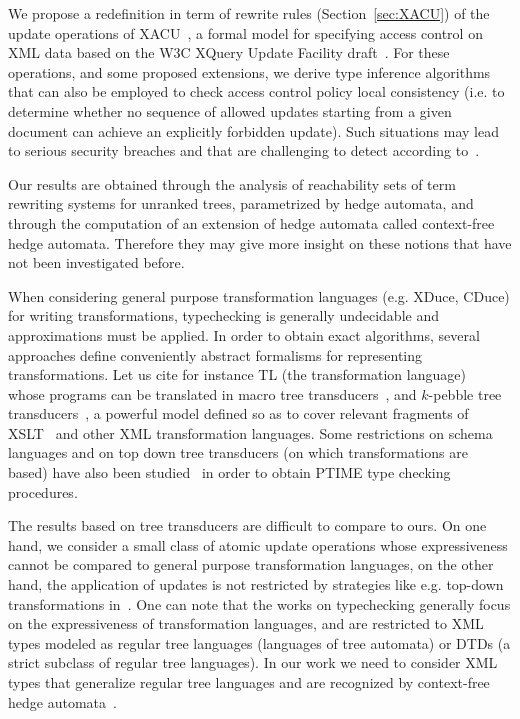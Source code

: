 \documentclass[a4paper]{article}
\newcommand{\remarque}[1]{}
\theoremstyle{plain}
\newcommand{\XACU}{\textsf{XACU}}
\begin{document}
We propose a redefinition in term of rewrite rules (Section~\ref{sec:XACU})  
of the update operations of \XACU~\cite{FundulakiManeth07}, 
a formal model for specifying access control on XML data 
based on the W3C XQuery Update Facility draft~\cite{xqupdate}.
For these operations, and some proposed extensions,
we derive type inference algorithms that can also be 
employed to check access control policy local consistency
(i.e. to determine whether no sequence of allowed updates 
 starting from a given document can achieve 
 an explicitly forbidden update). 
Such situations may lead to serious security breaches 
and that are  challenging to detect according to~\cite{FundulakiManeth07}.
\remarque{+ provide control of application context}
Our results are obtained through the analysis of reachability sets of 
term rewriting systems for unranked trees, 
parametrized by hedge automata, and through the computation  
of an extension of hedge automata called context-free hedge automata. 
Therefore they may give more insight on these notions that have not been investigated before. 


\medskip{}
When considering general purpose transformation languages (e.g. XDuce, CDuce)
for writing transformations, typechecking is generally undecidable
and approximations must be applied.
In order to obtain exact algorithms, several approaches define conveniently
abstract formalisms for representing transformations.
Let us cite for instance TL (the transformation language)~\cite{ManethBPS05}
whose programs can be translated in macro tree transducers~\cite{MTT04},
and $k$-pebble tree transducers~\cite{MiloSuciuVianu03},
a powerful model defined so as to cover relevant fragments
of XSLT~\cite{XSLT} and other XML transformation languages.
Some restrictions on schema languages and on
top down tree transducers (on which transformations are based)
have also been studied~\cite{MartensNeven04}
in order to obtain PTIME type checking procedures.

The  results based on tree transducers are difficult to compare to ours. 
On one hand, we consider a small class of atomic update operations
whose expressiveness cannot be compared to general purpose transformation languages,
on the other hand, the application of updates is not restricted by strategies 
like e.g. top-down  transformations in~\cite{MartensNeven04}.
One can note that the works on typechecking
generally focus on the expressiveness of transformation languages,
and are restricted to XML types modeled as regular tree languages 
(languages of tree automata) or DTDs (a strict subclass of regular tree languages).
In our work we need to consider  XML types that generalize  regular tree languages 
and are recognized by context-free hedge automata~\cite{JR-rta2008}. 
\end{document}
